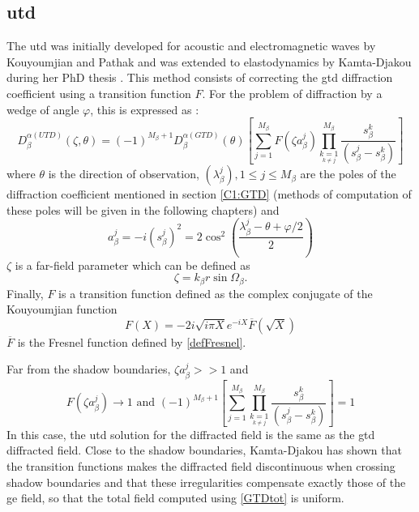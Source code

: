 \subsection{\acrfull{utd}}
The \acrfull{utd} was initially developed for acoustic and electromagnetic waves by Kouyoumjian and Pathak \cite{Kouyoumjian,PathakKouyou} and was extended to elastodynamics by Kamta-Djakou during her PhD thesis \cite{Audrey,AKDthese}. This method consists of correcting the \acrshort{gtd} diffraction coefficient using a transition function $F$. For the problem of diffraction by a wedge of angle $\varphi$, this is expressed as :
\begin{equation}
    D_{\beta}^{\alpha(UTD)}(\zeta,\theta)=(-1)^{M_{\beta}+1}D_{\beta}^{\alpha(GTD)}(\theta)\left[ \sum_{j=1}^{M_{\beta}} F(\zeta a^j_{\beta})\prod_{\underset{k\neq j}{k=1}}^{M_{\beta}} \dfrac{s_\beta^{k}}{(s_\beta^{j}-s_\beta^{k})}\right]
    \label{DUTDGTD}
\end{equation}
where $\theta$ is the direction of observation, $(\lambda^j_{\beta}), 1\leq j\leq M_{\beta}$ are the poles of the diffraction coefficient mentioned in section \ref{C1:GTD} (methods of computation of these poles will be given in the following chapters) and 
\begin{equation}
    a_{\beta}^j=-i(s_{\beta}^j)^2=2\cos^2\left(\frac{\lambda_{\beta}^j-\theta+\varphi/2}{2}\right)
\end{equation}
$\zeta$ is a far-field parameter which can be defined as
\begin{equation}
    \zeta=k_{\beta}r\sin\Omega_{\beta}.
\end{equation}
Finally, $F$ is a transition function defined as the complex conjugate of the Kouyoumjian function \cite{Kouyoumjian}
\begin{equation}
    F(X)=-2i\sqrt{i\pi X}e^{-iX}\overline{F}(\sqrt{X})
\end{equation}
$\overline{F}$ is the Fresnel function defined by \eqref{defFresnel}.

Far from the shadow boundaries, $\zeta a_{\beta}^j >>1$ and
\begin{equation}
F(\zeta a_{\beta}^j) \rightarrow 1 \mbox{ and } (-1)^{M_{\beta}+1}\left[ \sum_{j=1}^{M_{\beta}} \prod_{\underset{k\neq j}{k=1}}^{M_{\beta}} \dfrac{s_\beta^{k}}{(s_\beta^{j}-s_\beta^{k})}\right]=1
\end{equation}
In this case, the \acrshort{utd} solution for the diffracted field is the same as the \acrshort{gtd} diffracted field. Close to the shadow boundaries, Kamta-Djakou \cite{AKDthese} has shown that the transition functions makes the diffracted field discontinuous when crossing shadow boundaries and that these irregularities compensate exactly those of the \acrshort{ge} field, so that the total field computed using \eqref{GTDtot} is uniform.

